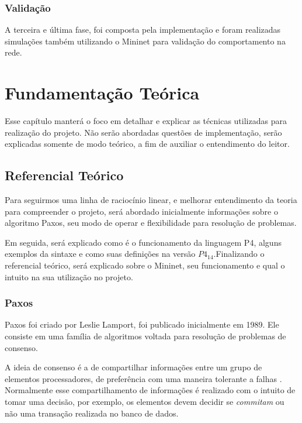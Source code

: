 \documentclass[
    12pt,
    openright, 
    oneside,
    a4paper,
    french,
    english,
    brazil
    ]{facom-ufu-abntex2}
\theoremstyle{definition}
\begin{document}
\subsection{Validação}
A terceira e última fase, foi composta pela implementação e foram realizadas
simulações também utilizando o Mininet para validação do comportamento na rede.
\cite{dang2015netpaxos}


\chapter{Fundamentação Teórica}
Esse capítulo manterá o foco em detalhar e explicar as técnicas utilizadas para realização 
do projeto. Não serão abordadas questões de implementação, serão explicadas somente de modo
teórico, a fim de auxiliar o entendimento do leitor.

\section{Referencial Teórico}
Para seguirmos uma linha de raciocínio linear, e melhorar entendimento da teoria
para compreender o projeto, será abordado inicialmente informações sobre o 
algoritmo Paxos, seu modo de operar e flexibilidade para resolução de problemas.

Em seguida, será explicado como é o funcionamento da linguagem P4, alguns exemplos da sintaxe e como suas definições na versão $P4_{14}$.Finalizando o referencial teórico, será  explicado sobre o Mininet, seu funcionamento e qual o intuito na sua utilização no projeto.

\subsection{Paxos}
Paxos foi criado por Leslie Lamport, foi publicado inicialmente em 1989. Ele consiste em uma 
família de algoritmos voltada para resolução de problemas de consenso. 

A ideia de consenso é a de compartilhar informações entre um grupo de elementos
processadores, de preferência com uma maneira tolerante a falhas \cite{barborak1993consensus}.
Normalmente esse compartilhamento de informações é realizado com o intuito de tomar
uma decisão, por exemplo, os elementos devem decidir se \emph{commitam} ou não
uma transação realizada no banco de dados. 
\end{document}
